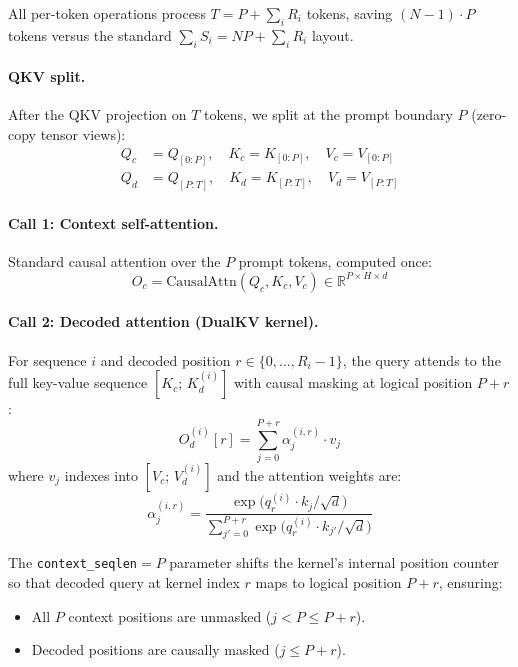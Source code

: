 \documentclass{article}
\begin{document}
All per-token operations process $T = P + \sum_i R_i$ tokens, saving $(N{-}1) \cdot P$ tokens versus the standard $\sum_i S_i = NP + \sum_i R_i$ layout.

\paragraph{QKV split.} After the QKV projection on $T$ tokens, we split at the prompt boundary $P$ (zero-copy tensor views):
\begin{align}
  Q_c &= Q_{[0:P]}, \quad K_c = K_{[0:P]}, \quad V_c = V_{[0:P]} \label{eq:ctx-split} \\
  Q_d &= Q_{[P:T]}, \quad K_d = K_{[P:T]}, \quad V_d = V_{[P:T]} \label{eq:dec-split}
\end{align}

\paragraph{Call 1: Context self-attention.} Standard causal attention over the $P$ prompt tokens, computed once:
\begin{equation}
  O_c = \text{CausalAttn}(Q_c, K_c, V_c) \in \mathbb{R}^{P \times H \times d}
  \label{eq:call1}
\end{equation}

\paragraph{Call 2: Decoded attention (DualKV kernel).} For sequence $i$ and decoded position $r \in \{0, \ldots, R_i - 1\}$, the query attends to the full key-value sequence $[K_c;\, K_d^{(i)}]$ with causal masking at logical position $P + r$:
\begin{equation}
  O_d^{(i)}[r] = \sum_{j=0}^{P + r} \alpha_j^{(i,r)} \cdot v_j
  \label{eq:call2}
\end{equation}
where $v_j$ indexes into $[V_c;\, V_d^{(i)}]$ and the attention weights are:
\begin{equation}
  \alpha_j^{(i,r)} = \frac{\exp\!\big(q_r^{(i)} \cdot k_j / \sqrt{d}\big)}{\sum_{j'=0}^{P+r} \exp\!\big(q_r^{(i)} \cdot k_{j'} / \sqrt{d}\big)}
\end{equation}

The \texttt{context\_seqlen}${}= P$ parameter shifts the kernel's internal position counter so that decoded query at kernel index $r$ maps to logical position $P + r$, ensuring:
\begin{itemize}
  \item All $P$ context positions are unmasked ($j < P \leq P + r$).
  \item Decoded positions are causally masked ($j \leq P + r$).
\end{itemize}
\end{document}
